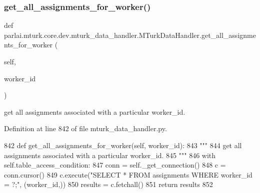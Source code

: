 \subsubsection{\texorpdfstring{get\+\_\+all\+\_\+assignments\+\_\+for\+\_\+worker()}{get\_all\_assignments\_for\_worker()}}
{\footnotesize\ttfamily def parlai.\+mturk.\+core.\+dev.\+mturk\+\_\+data\+\_\+handler.\+M\+Turk\+Data\+Handler.\+get\+\_\+all\+\_\+assignments\+\_\+for\+\_\+worker (\begin{DoxyParamCaption}\item[{}]{self,  }\item[{}]{worker\+\_\+id }\end{DoxyParamCaption})}

\begin{DoxyVerb}get all assignments associated with a particular worker_id.
\end{DoxyVerb}
 

Definition at line 842 of file mturk\+\_\+data\+\_\+handler.\+py.


\begin{DoxyCode}
842     \textcolor{keyword}{def }get\_all\_assignments\_for\_worker(self, worker\_id):
843         \textcolor{stringliteral}{"""}
844 \textcolor{stringliteral}{        get all assignments associated with a particular worker\_id.}
845 \textcolor{stringliteral}{        """}
846         with self.table\_access\_condition:
847             conn = self.\_get\_connection()
848             c = conn.cursor()
849             c.execute(\textcolor{stringliteral}{"SELECT * FROM assignments WHERE worker\_id = ?;"}, (worker\_id,))
850             results = c.fetchall()
851             \textcolor{keywordflow}{return} results
852 
\end{DoxyCode}
\mbox{\label{classparlai_1_1mturk_1_1core_1_1dev_1_1mturk__data__handler_1_1MTurkDataHandler_ab4f6bcf277206b3ac02971f208c2ec32}} 

